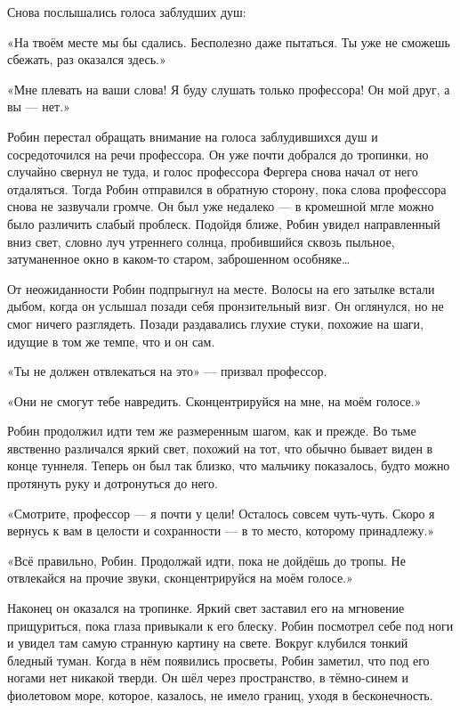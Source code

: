 \documentclass[a5paper, 9pt,
final, openany, twoside=true]{memoir}
\begin{document}
Снова послышались голоса заблудших душ:

«На твоём месте мы бы сдались. Бесполезно даже пытаться. Ты уже не сможешь сбежать, раз оказался здесь.»

«Мне плевать на ваши слова! Я буду слушать только профессора! Он мой друг, а вы — нет.»\bigskip

Робин перестал обращать внимание на голоса заблудившихся душ и сосредоточился на речи профессора. Он уже почти добрался до тропинки, но случайно свернул не туда, и голос профессора Фергера снова начал от него отдаляться. Тогда Робин отправился в обратную сторону, пока слова профессора снова не зазвучали громче. Он был уже недалеко — в кромешной мгле можно было различить слабый проблеск. Подойдя ближе, Робин увидел направленный вниз свет, словно луч утреннего солнца, пробившийся сквозь пыльное, затуманенное окно в каком-то старом, заброшенном особняке…

От неожиданности Робин подпрыгнул на месте. Волосы на его затылке встали дыбом, когда он услышал позади себя пронзительный визг. Он оглянулся, но не смог ничего разглядеть. Позади раздавались глухие стуки, похожие на шаги, идущие в том же темпе, что и он сам.

«Ты не должен отвлекаться на это» — призвал профессор.

«Они не смогут тебе навредить. Сконцентрируйся на мне, на моём голосе.»

Робин продолжил идти тем же размеренным шагом, как и прежде. Во тьме явственно различался яркий свет, похожий на тот, что обычно бывает виден в конце туннеля. Теперь он был так близко, что мальчику показалось, будто можно протянуть руку и дотронуться до него.

«Смотрите, профессор — я почти у цели! Осталось совсем чуть-чуть. Скоро я вернусь к вам в целости и сохранности — в то место, которому принадлежу.»

«Всё правильно, Робин. Продолжай идти, пока не дойдёшь до тропы. Не отвлекайся на прочие звуки, сконцентрируйся на моём голосе.»\bigskip

Наконец он оказался на тропинке. Яркий свет заставил его на мгновение прищуриться, пока глаза привыкали к его блеску. Робин посмотрел себе под ноги и увидел там самую странную картину на свете. Вокруг клубился тонкий бледный туман. Когда в нём появились просветы, Робин заметил, что под его ногами нет никакой тверди. Он шёл через пространство, в тёмно-синем и фиолетовом море, которое, казалось, не имело границ, уходя в бесконечность.
\end{document}
